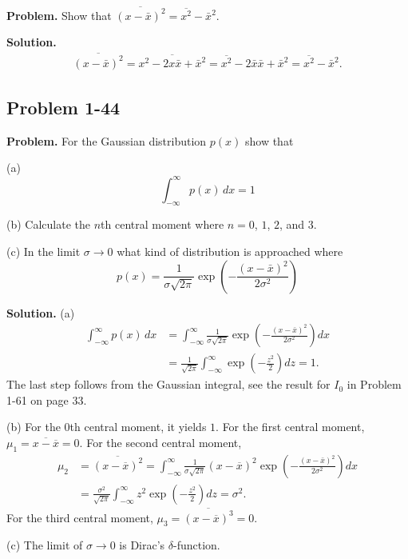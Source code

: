 \documentclass[twocolumn, 10pt]{article}
\numberwithin{equation}{section}
\newenvironment{problem}
{\par\medskip\sffamily \color{problue}
  \textbf{Problem. }\ignorespaces}
{\medskip}
\newenvironment{solution}
{\par\medskip
  \textbf{Solution. }\ignorespaces}
{\medskip}
\begin{document}
\begin{problem}
  Show that $\overline{ (x - \bar x)^2 } = \overline{ x^2 } - \bar x^2$.
\end{problem}

\begin{solution}
\begin{align*}
  \overline{ (x - \bar x)^2 }
  =
  \overline{ x^2  - 2 x \bar x + {\bar x}^2 }
  =
  \overline{ x^2 } - 2 \bar x \bar x + {\bar x}^2
  =
  \overline{ x^2 }  - {\bar x}^2.
\end{align*}
\end{solution}

\subsection{Problem 1-44}

\begin{problem}
  For the Gaussian distribution $p(x)$ show that

  (a)
  $$\int_{-\infty}^\infty p(x) \, dx  = 1$$

  (b)
  Calculate the $n$th central moment
  where $n = 0$, $1$, $2$, and $3$.

  (c)
  In the limit $\sigma \to 0$
  what kind of distribution is approached where
  $$
  p(x) = \frac{1}{\sigma \sqrt{2\pi}}
  \exp\left( -\frac{ (x -\bar x)^2 } { 2 \sigma^2} \right)
  $$
\end{problem}

\begin{solution}
  (a)
  \begin{align*}
  \int_{-\infty}^\infty p(x) \, dx
  &=
  \int_{-\infty}^\infty
  \frac{1}{\sigma \sqrt{2\pi}}
  \exp\left( -\frac{ (x -\bar x)^2 } { 2 \sigma^2} \right) dx
  \\
  &=
  \frac{1}{\sqrt{2\pi}}
  \int_{-\infty}^\infty
  \exp\left( -\frac{ z^2 } { 2} \right) dz
  =
  1.
  \end{align*}
  The last step follows from the Gaussian integral,
  see the result for $I_0$ in Problem 1-61 on page 33.

  (b)
  For the $0$th central moment, it yields $1$.
  For the first central moment,
  $\mu_1 = \overline{ x - \overline x} = 0$.
  For the second central moment,
  \begin{align*}
  \mu_2
  &= \overline{ (x - \overline x)^2 }
  =
  \int_{-\infty}^\infty
  \frac{1}{\sigma \sqrt{2\pi}}
    (x- \overline x)^2 \exp\left( -\frac{ (x -\bar x)^2 } { 2 \sigma^2} \right) dx
  \\
  &=
  \frac{\sigma^2}{ \sqrt{2\pi}}
  \int_{-\infty}^\infty
    z^2 \exp\left( -\frac{ z^2 } {2} \right) dz
  =
  \sigma^2.
  \end{align*}
  For the third central moment,
  $\mu_3 = \overline{ (x - \overline x)^3 } = 0$.

  (c) The limit of $\sigma \to 0$ is Dirac's $\delta$-function.
\end{solution}
\end{document}
